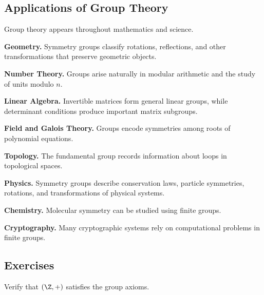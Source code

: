\subsection{Applications of Group Theory}
\label{subsec:group-theory-applications}

Group theory appears throughout mathematics and science.

\begin{applicationbox}
\textbf{Geometry.}
Symmetry groups classify rotations, reflections, and other transformations
that preserve geometric objects.

\medskip

\textbf{Number Theory.}
Groups arise naturally in modular arithmetic and the study of units modulo
\(n\).

\medskip

\textbf{Linear Algebra.}
Invertible matrices form general linear groups, while determinant conditions
produce important matrix subgroups.

\medskip

\textbf{Field and Galois Theory.}
Groups encode symmetries among roots of polynomial equations.

\medskip

\textbf{Topology.}
The fundamental group records information about loops in topological spaces.

\medskip

\textbf{Physics.}
Symmetry groups describe conservation laws, particle symmetries, rotations,
and transformations of physical systems.

\medskip

\textbf{Chemistry.}
Molecular symmetry can be studied using finite groups.

\medskip

\textbf{Cryptography.}
Many cryptographic systems rely on computational problems in finite groups.
\end{applicationbox}

\subsection{Exercises}
\label{subsec:group-theory-exercises}

\begin{exercise}[1]
Verify that \((\Z,+)\) satisfies the group axioms.
\end{exercise}

